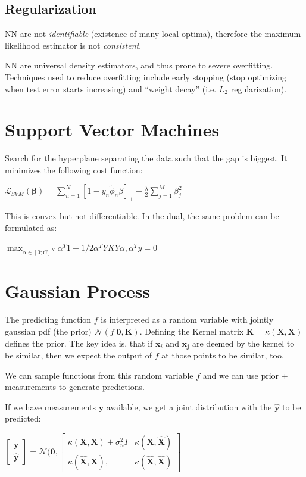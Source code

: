 \documentclass[10pt,a4paper,landscape]{article}
\providecommand{\bf}[1]{\ensuremath{\mathbf{#1}}}
\begin{document}
\begin{multicols*}{4}
\subsection{Regularization}
NN are not \textit{identifiable} (existence of many local optima), therefore the maximum likelihood estimator is not \textit{consistent}.

NN are universal density estimators, and thus prone to severe overfitting. Techniques used to reduce overfitting include early stopping (stop optimizing when test error starts increasing) and ``weight decay'' (i.e. $L_2$ regularization).

\section{Support Vector Machines}
Search for the hyperplane separating the data such that the gap is biggest.
It minimizes the following cost function:

$\mathcal{L}_{SVM} (\bf{\beta})= \sum_{n=1}^N [1 - y_n \tilde\phi_n \beta]_{+} + \frac{\lambda}{2} \sum_{j=1}^M \beta_j^2$

This is convex but not differentiable. In the dual, the same problem can be formulated as:

$\max_{\alpha \in [0; C]^N} \alpha^T 1 - 1/2 \alpha^T Y K Y \alpha , \alpha^T y = 0$

\section{Gaussian Process}
The predicting function $f$ is interpreted as a random variable with jointly gaussian pdf (the prior) $\mathcal{N}(f | \bf{0}, \bf{K})$.
Defining the Kernel matrix $\bf{K} = \kappa(\bf{X}, \bf{X})$ defines the prior. The key idea is, that if $\bf{x}_i$ and $\bf{x_j}$ are
deemed by the kernel to be similar, then we expect the output of $f$ at those points to be similar, too.

We can sample functions from this random variable $f$ and we can use prior + measurements to generate predictions.

If we have measurements $\bf{y}$ available, we get a joint distribution with the $\bf{\hat{y}}$ to be predicted:

$\begin{bmatrix} \bf{y} \\ \bf{\hat{y}} \end{bmatrix} = \mathcal{N}(\bf{0},
\begin{bmatrix} 	\kappa(\bf{X}, \bf{X}) + \sigma_n^2 I 		& \kappa(\bf{X}, \bf{\hat{X}}) \\
						\kappa(\bf{\hat{X}}, \bf{X}),							& \kappa(\bf{\hat{X}}, \bf{\hat{X}})
\end{bmatrix}$


\end{multicols*}
\end{document}
